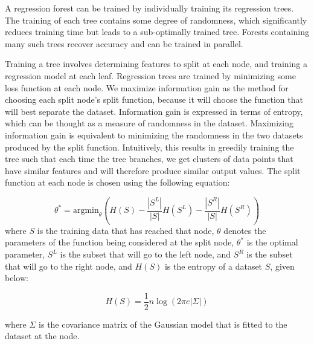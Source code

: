 A regression forest can be trained by individually training its regression trees. The training of each tree contains some degree of randomness, which significantly reduces training time but leads to a sub-optimally trained tree. Forests containing many such trees recover accuracy and can be trained in parallel.

Training a tree involves determining features to split at each node, and training a regression model at each leaf. Regression trees are trained by minimizing some loss function at each node. We maximize information gain as the method for choosing each split node's split function, because it will choose the function that will best separate the dataset. Information gain is expressed in terms of entropy, which can be thought as a measure of randomness in the dataset. Maximizing information gain is equivalent to minimizing the randomness in the two datasets produced by the split function. Intuitively, this results in greedily training the tree such that each time the tree branches, we get clusters of data points that have similar features and will therefore produce similar output values. The split function at each node is chosen using the following equation:

\begin{equation}
  \theta^* = \text{argmin}_{\theta}(H(S) - \frac{|S^L|}{|S|} H(S^L) - \frac{|S^R|}{|S|} H(S^R))
\end{equation}
where $S$ is the training data that has reached that node, $\theta$ denotes the parameters of the function being considered at the split node, $\theta^*$ is the optimal parameter, $S^L$ is the subset that will go to the left node, and $S^R$ is the subset that will go to the right node, and $H(S)$ is the entropy of a dataset $S$, given below:

\begin{equation}
  H(S) = \frac{1}{2} n \log(2\pi e  |\Sigma|)
\end{equation}

where $\Sigma$ is the covariance matrix of the Gaussian model that is fitted to the dataset at the node.

